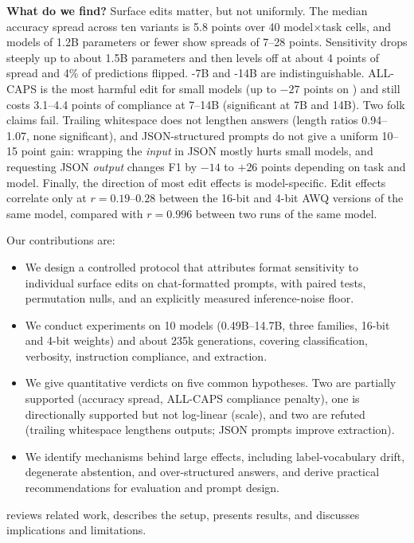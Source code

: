 {\bf What do we find?} Surface edits matter, but not uniformly. The median accuracy spread across ten variants is 5.8 points over 40 model$\times$task cells, and models of 1.2B parameters or fewer show spreads of 7--28 points. Sensitivity drops steeply up to about 1.5B parameters and then levels off at about 4 points of spread and 4\% of predictions flipped. \qwen-7B and \qwen-14B are indistinguishable. ALL-CAPS is the most harmful edit for small models (up to $-27$ points on \sst) and still costs 3.1--4.4 points of \ifeval compliance at 7--14B (significant at 7B and 14B). Two folk claims fail. Trailing whitespace does not lengthen answers (length ratios 0.94--1.07, none significant), and JSON-structured prompts do not give a uniform 10--15 point gain: wrapping the \emph{input} in JSON mostly hurts small models, and requesting JSON \emph{output} changes F1 by $-14$ to $+26$ points depending on task and model. Finally, the direction of most edit effects is model-specific. Edit effects correlate only at $r=0.19$--$0.28$ between the 16-bit and 4-bit AWQ versions of the same model, compared with $r=0.996$ between two runs of the same model.

Our contributions are:
\begin{itemize}[leftmargin=*,itemsep=0pt,topsep=0pt]
    \item We design a controlled protocol that attributes format sensitivity to individual surface edits on chat-formatted prompts, with paired tests, permutation nulls, and an explicitly measured inference-noise floor.
    \item We conduct experiments on 10 models (0.49B--14.7B, three families, 16-bit and 4-bit weights) and about 235k generations, covering classification, verbosity, instruction compliance, and extraction.
    \item We give quantitative verdicts on five common hypotheses. Two are partially supported (accuracy spread, ALL-CAPS compliance penalty), one is directionally supported but not log-linear (scale), and two are refuted (trailing whitespace lengthens outputs; JSON prompts improve extraction).
    \item We identify mechanisms behind large effects, including label-vocabulary drift, degenerate abstention, and over-structured answers, and derive practical recommendations for evaluation and prompt design.
\end{itemize}

 reviews related work,  describes the setup,  presents results, and  discusses implications and limitations.

